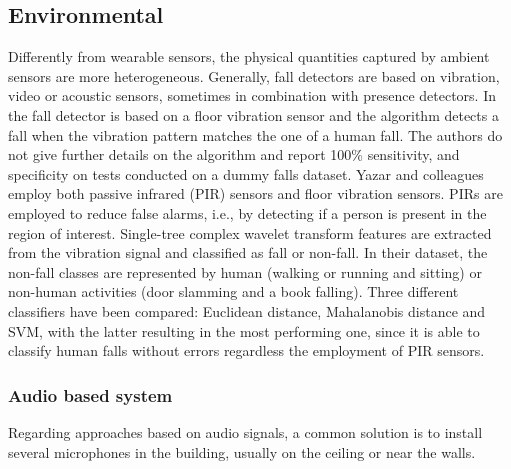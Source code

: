 \subsection{Environmental}
Differently from wearable sensors, the physical quantities captured by ambient sensors are more heterogeneous. Generally, fall detectors are based on vibration, video or acoustic sensors, sometimes in combination with presence detectors.  In \cite{alwan2006smart} the fall detector is based on a floor vibration sensor and the algorithm detects a fall when the vibration pattern matches the one of a human fall. The authors do not give further details on the algorithm and report 100\% sensitivity, and specificity on tests conducted on a dummy falls dataset. Yazar and colleagues \cite{Yazar2013} employ both passive infrared (PIR) sensors and floor vibration sensors. PIRs are employed to reduce false alarms, i.e., by detecting if a person is present in the region of interest. Single-tree complex wavelet transform features are extracted from the vibration signal and classified as fall or non-fall. In their dataset, the non-fall classes are represented by human (walking or running and sitting) or non-human activities (door slamming and a book falling). Three different classifiers have been compared: Euclidean distance, Mahalanobis distance and SVM, with the latter resulting in the most performing one, since it is able to classify human falls without errors regardless the employment of PIR sensors.

\subsubsection{Audio based system}
Regarding approaches based on audio signals, a common solution is to install several microphones in the building, usually on the ceiling or near the walls.
